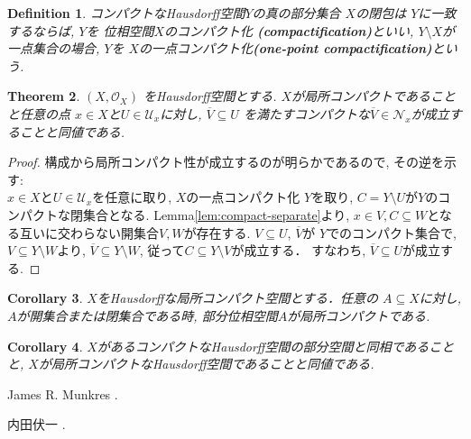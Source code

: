 \documentclass[lualatex]{ltjsbook}
\newcommand{\cl}[1]{\overline{ #1}  }
\newtheorem{theorem}{Theorem}[chapter]
\newtheorem{corollary}[theorem]{Corollary}
\newtheorem{definition}[theorem]{Definition}
\theoremstyle{remark}
\theoremstyle{plain}
\begin{document}
\begin{definition}
	コンパクトなHausdorff空間$Y$の真の部分集合 $X$の閉包は $Y$に一致するならば,  
	$Y$を 位相空間$X$のコンパクト化 \textbf{(compactification)}といい,  
	$Y \setminus X$が一点集合の場合, 
	$Y$を $X$の一点コンパクト化\textbf{(one-point compactification)}という.
\end{definition}



\begin{theorem}
	$\left( X ,  \mathcal{O}_{X} \right)$ をHausdorff空間とする. 
	$X$が局所コンパクトであることと任意の点 $x \in X$と$U \in \mathcal{U}_x$に対し,  
	$\overline{V} \subseteq U$ を満たすコンパクトな$\overline{V} \in  \mathcal{N}_x$が成立することと同値である.
\end{theorem}

\begin{proof}
	構成から局所コンパクト性が成立するのが明らかであるので,  その逆を示す:\\
	$x \in X$と$U \in \mathcal{U}_x$を任意に取り,  $X$の一点コンパクト化 $Y$を取り,  
	$C = Y \setminus U$が$Y$のコンパクトな閉集合となる. 
	Lemma\ref{lem:compact-separate}より, 
	$x \in V,  C \subseteq W $となる互いに交わらない開集合$V , W$が存在する. 
	$V \subseteq U$,  $\cl{V}$が $Y$でのコンパクト集合で,  
	$V \subseteq Y \setminus W$より,  
	$\cl{V} \subseteq Y \setminus W$, 
	従って$C \subseteq Y \setminus V$が成立する． 
	すなわち,  $\cl{V} \subseteq U$が成立する.
\end{proof}

\begin{corollary}
	$X$をHausdorffな局所コンパクト空間とする．任意の $A \subseteq X$に対し,  $A$が開集合または閉集合である時,  部分位相空間$A$が局所コンパクトである.
\end{corollary}

\begin{corollary}
	$X$があるコンパクトなHausdorff空間の部分空間と同相であることと,   $X$が局所コンパクトなHausdorff空間であることと同値である.
\end{corollary}





\begin{thebibliography}{99}
	 James R. Munkres 
	.

	 内田伏一 
	.
\end{thebibliography}
\end{document}

